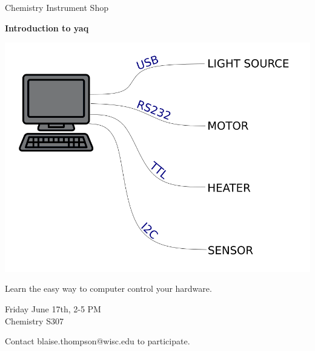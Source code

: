 \documentclass{article}
\begin{document}
\center

\Huge

Chemistry Instrument Shop

\textbf{
Introduction to yaq
}

\includegraphics[width=\linewidth]{coverart.png}

{
\huge
Learn the easy way to computer control your hardware.
}

\vfill

{
\huge
Friday June 17th, 2-5 PM \\
Chemistry S307
}

\vfill

{
\huge
Contact blaise.thompson@wisc.edu to participate.
}
\end{document}
